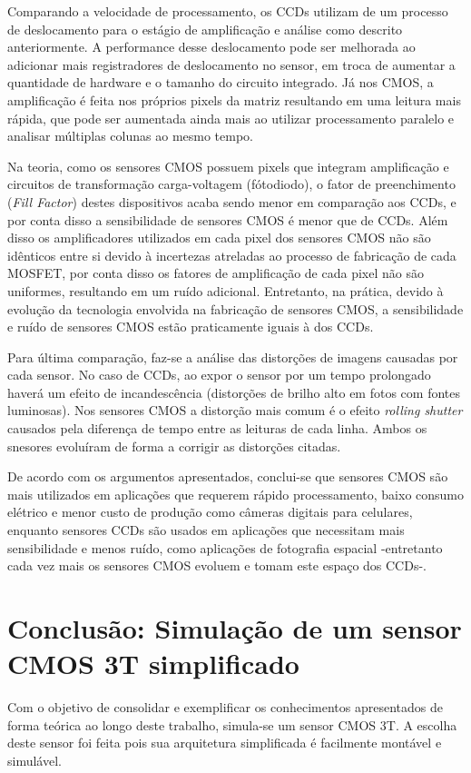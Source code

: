 \documentclass[10pt,a4paper,twocolumn]{article}
\begin{document}
	Comparando a velocidade de processamento, os CCDs utilizam de um processo de deslocamento para o estágio de amplificação e análise como descrito anteriormente. A performance desse deslocamento pode ser melhorada ao adicionar mais registradores de deslocamento no sensor, em troca de aumentar a quantidade de hardware e o tamanho do circuito integrado. Já nos CMOS, a amplificação é feita nos próprios pixels da matriz resultando em uma leitura mais rápida, que pode ser aumentada ainda mais ao utilizar processamento paralelo e analisar múltiplas colunas ao mesmo tempo.
	
	Na teoria, como os sensores CMOS possuem pixels que integram amplificação e circuitos de transformação carga-voltagem (fótodiodo), o fator de preenchimento (\textit{Fill Factor}) destes dispositivos acaba sendo menor em comparação aos CCDs, e por conta disso a sensibilidade de sensores CMOS é menor que de CCDs. Além disso os amplificadores utilizados em cada pixel dos sensores CMOS não são idênticos entre si devido à incertezas atreladas ao processo de fabricação de cada MOSFET, por conta disso os fatores de amplificação de cada pixel não são uniformes, resultando em um ruído adicional. Entretanto, na prática, devido à evolução da tecnologia envolvida na fabricação de sensores CMOS, a sensibilidade e ruído de sensores CMOS estão praticamente iguais à dos CCDs.
	
	Para última comparação, faz-se a análise das distorções de imagens causadas por cada sensor. No caso de CCDs, ao expor o sensor por um tempo prolongado haverá um efeito de incandescência (distorções de brilho alto em fotos com fontes luminosas). Nos sensores CMOS a distorção mais comum é o efeito \textit{rolling shutter} causados pela diferença de tempo entre as leituras de cada linha. Ambos os snesores evoluíram de forma a corrigir as distorções citadas.
	
	De acordo com os argumentos apresentados, conclui-se que sensores CMOS são mais utilizados em aplicações que requerem rápido processamento, baixo consumo elétrico e menor custo de produção como câmeras digitais para celulares, enquanto sensores CCDs são usados em aplicações que necessitam mais sensibilidade e menos ruído, como aplicações de fotografia espacial -entretanto cada vez mais os sensores CMOS evoluem e tomam este espaço dos CCDs-.
	
	\section*{Conclusão: Simulação de um sensor CMOS 3T simplificado}
	Com o objetivo de consolidar e exemplificar os conhecimentos apresentados de forma teórica ao longo deste trabalho, simula-se um sensor CMOS 3T. A escolha deste sensor foi feita pois sua arquitetura simplificada é facilmente montável e simulável.
		
\end{document}

